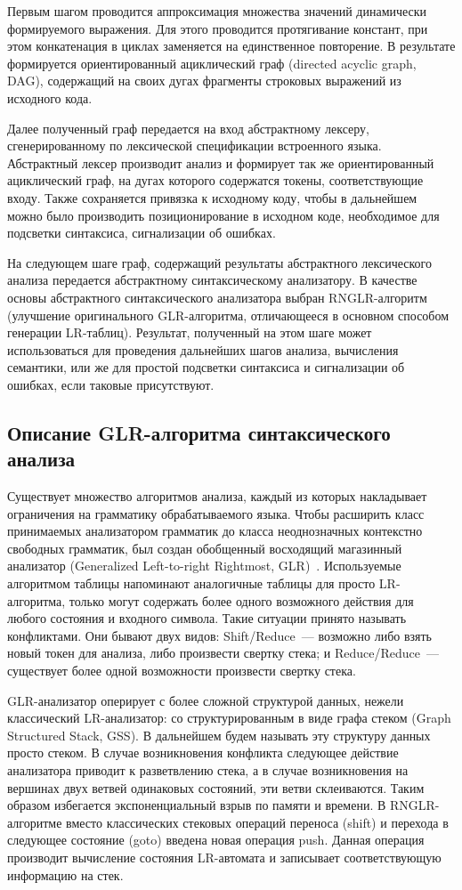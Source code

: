Первым шагом проводится аппроксимация множества значений динамически формируемого 
выражения. Для этого проводится протягивание констант, при этом конкатенация в циклах 
заменяется на единственное повторение. В результате формируется ориентированный 
ациклический граф (directed acyclic graph, DAG), содержащий на своих дугах 
фрагменты строковых выражений из исходного кода. 

Далее полученный граф передается на вход абстрактному лексеру, сгенерированному 
по лексической спецификации встроенного языка. Абстрактный лексер производит 
анализ и формирует так же ориентированный ациклический граф, на дугах которого
содержатся токены, соответствующие входу. Также сохраняется привязка к исходному 
коду, чтобы в дальнейшем можно было производить позиционирование в исходном коде, 
необходимое для подсветки синтаксиса, сигнализации об ошибках. 

На следующем шаге граф, содержащий результаты абстрактного лексического анализа 
передается абстрактному синтаксическому анализатору. В качестве основы абстрактного 
синтаксического анализатора выбран RNGLR-алгоритм (улучшение оригинального GLR-алгоритма, 
отличающееся в основном способом генерации LR-таблиц). Результат, полученный на 
этом шаге может использоваться для проведения дальнейших шагов анализа, вычисления 
семантики, или же для простой подсветки синтаксиса и сигнализации об ошибках, 
если таковые присутствуют.

\subsection{Описание GLR-алгоритма синтаксического анализа}
Существует множество алгоритмов анализа, каждый из которых накладывает ограничения 
на грамматику обрабатываемого языка. Чтобы расширить класс принимаемых анализатором
грамматик до класса неоднозначных контекстно свободных грамматик, был создан 
обобщенный восходящий магазинный анализатор (Generalized Left-to-right Rightmost,
GLR)~\cite{Tomita:1985:EPN:537456}. Используемые алгоритмом таблицы напоминают аналогичные таблицы для просто 
LR-алгоритма, только могут содержать более одного возможного действия для любого 
состояния и входного символа. Такие ситуации принято называть конфликтами. Они 
бывают двух видов: Shift/Reduce~— возможно либо взять новый токен для анализа,
либо произвести свертку стека; и Reduce/Reduce~— существует более одной возможности 
произвести свертку стека. 

GLR-анализатор оперирует с более сложной структурой данных, нежели классический 
LR-анализатор: со структурированным в виде графа стеком (Graph Structured Stack, GSS). 
В дальнейшем будем называть эту структуру данных просто стеком.  В случае возникновения 
конфликта следующее действие анализатора приводит к разветвлению стека, а в случае 
возникновения на вершинах двух ветвей одинаковых состояний, эти ветви склеиваются.
Таким образом избегается экспоненциальный взрыв по памяти и времени. В RNGLR-алгоритме 
вместо классических стековых операций переноса (shift) и перехода в следующее состояние 
(goto) введена новая операция push. Данная операция производит вычисление состояния 
LR-автомата и записывает соответствующую информацию на стек. 

